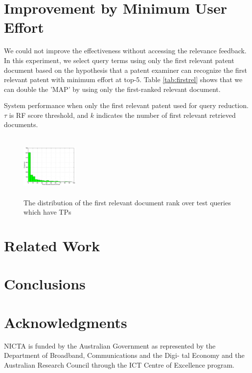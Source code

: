 \documentclass{sig-alternate}
\begin{document}
\section{Improvement by Minimum User Effort}
We could not improve the effectiveness without accessing the relevance feedback. In this experiment, we select query terms using only the first relevant patent document based on the hypothesis that a patent examiner can recognize the first relevant patent with minimum effort at top-5. Table \ref{tab:firstrel} shows that we can double the 'MAP' by using only the first-ranked relevant document.
\begin{table}[htpb]
  \begin{center}
   \caption{System performance when only the first relevant patent used for query reduction. $\tau$ is RF score threshold, and $k$ indicates the number of first relevant retrieved documents.}
     
  \label{tab:firstrel}
  \end{center}  
\end{table}

\begin{figure}[htpb]
   \centering
   \includegraphics[width=0.25\textwidth,height=32mm]{figs/FirstTPRank.eps}
   \caption{The distribution of the first relevant document rank over test queries which have TPs}   
   \label{fig:FirstTPRankHisto} 
\end{figure}
\section{Related Work}

\section{Conclusions}


\section{Acknowledgments}
NICTA is funded by the Australian Government as represented
by the Department of Broadband, Communications and the Digi-
tal Economy and the Australian Research Council through the ICT
Centre of Excellence program.
\end{document}
